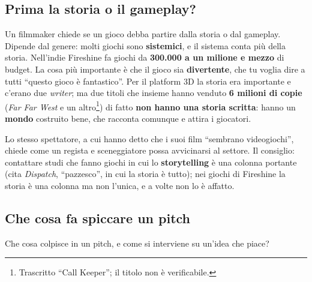 \subsection{Prima la storia o il gameplay?}

Un filmmaker chiede se un gioco debba partire dalla storia o dal gameplay.
Dipende dal genere: molti giochi sono \textbf{sistemici}, e il sistema conta più
della storia. Nell'indie Fireshine fa giochi da \textbf{300.000 a un milione e
mezzo} di budget. La cosa più importante è che il gioco sia \textbf{divertente},
che tu voglia dire a tutti ``questo gioco è fantastico''. Per il platform 3D la
storia era importante e c'erano due \emph{writer}; ma due titoli che insieme hanno
venduto \textbf{6 milioni di copie} (\emph{Far Far West} e un altro\footnote{
Trascritto ``Call Keeper''; il titolo non è verificabile.}) di fatto \textbf{non
hanno una storia scritta}: hanno un \textbf{mondo} costruito bene, che racconta
comunque e attira i giocatori.

Lo stesso spettatore, a cui hanno detto che i suoi film ``sembrano videogiochi'',
chiede come un regista e sceneggiatore possa avvicinarsi al settore. Il consiglio:
contattare studi che fanno giochi in cui lo \textbf{storytelling} è una colonna
portante (cita \emph{Dispatch}, ``pazzesco'', in cui la storia è tutto); nei giochi
di Fireshine la storia è una colonna ma non l'unica, e a volte non lo è affatto.

\subsection{Che cosa fa spiccare un pitch}

Che cosa colpisce in un pitch, e come si interviene su un'idea che piace?

